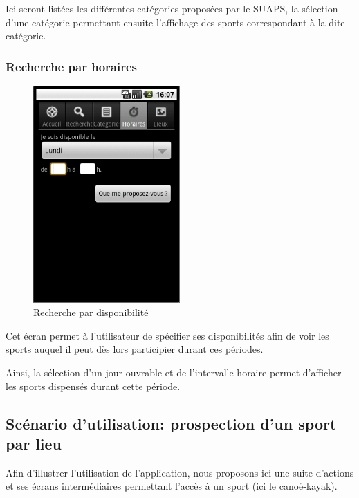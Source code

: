 \documentclass[french, titlepage, 11pt, a4paper]{article}
\begin{document}
		Ici seront listées les différentes catégories proposées par le SUAPS, la
		sélection d'une catégorie permettant ensuite l'affichage des sports
		correspondant à la dite catégorie.

		\subsubsection{Recherche par horaires}

		\begin{figure}[ht]
			\centering
			\includegraphics[width=0.5\textwidth]{horaires.png}
			\caption{Recherche par disponibilité}
			\label{fig:horaires}
		\end{figure}

		Cet écran permet à l'utilisateur de spécifier ses disponibilités afin de
		voir les sports auquel il peut dès lors participier durant ces périodes.

		Ainsi, la sélection d'un jour ouvrable et de l'intervalle horaire permet
		d'afficher les sports dispensés durant cette période.

	\subsection{Scénario d'utilisation: prospection d'un sport par lieu}

	Afin d'illustrer l'utilisation de l'application, nous proposons ici une suite
	d'actions et ses écrans intermédiaires permettant l'accès à un sport (ici le
	canoë-kayak).
\end{document}
